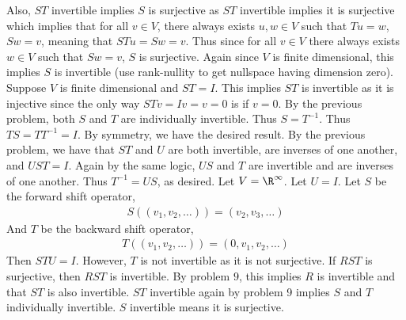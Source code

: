\documentclass{book}
\begin{document}
\begin{enumerate}[label=\arabic*)]
      Also, $ST$ invertible implies $S$ is surjective as $ST$ invertible implies it is surjective which implies that for all $v \in V$, there always exists $u, w \in V$ such that $Tu = w$,
      $Sw = v$, meaning that $STu = Sw = v$. Thus since for all $v \in V$ there always exists $w \in V$ such that $Sw = v$, $S$ is surjective. Again since $V$ is finite dimensional, this
      implies $S$ is invertible (use rank-nullity to get nullspace having dimension zero).
    \ii
      Suppose $V$ is finite dimensional and $ST = I$. This implies $ST$ is invertible as it is injective since the only way $STv = Iv = v = 0$ is if $v = 0$. By the previous problem, both
      $S$ and $T$ are individually invertible. Thus $S = T^{-1}$. Thus $TS = TT^{-1} = I$. By symmetry, we have the desired result.
    \ii
      By the previous problem, we have that $ST$ and $U$ are both invertible, are inverses of one another, and $UST = I$. Again by the same logic, $US$ and $T$ are invertible and are
      inverses of one another. Thus $T^{-1} = US$, as desired.
    \ii
      Let $V = \R^\infty$. Let $U = I$. Let $S$ be the forward shift operator,
      \begin{align*}
        S( (v_1, v_2, \dots)) = (v_2, v_3, \dots)
      \end{align*}
      And $T$ be the backward shift operator,
      \begin{align*}
        T( (v_1, v_2, \dots)) = (0, v_1, v_2, \dots)
      \end{align*}
      Then $STU = I$. However, $T$ is not invertible as it is not surjective.
    \ii
      If $RST$ is surjective, then $RST$ is invertible. By problem $9$, this implies $R$ is invertible and that $ST$ is also invertible. $ST$ invertible again by problem 9 implies $S$ and
      $T$ individually invertible. $S$ invertible means it is surjective.


\end{enumerate}
\end{document}
